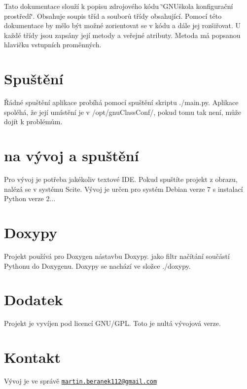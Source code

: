 Tato dokumentace slouží k popisu zdrojového kódu \char`\"{}\-G\-N\-Uškola konfigurační prostředí\char`\"{}. Obsahuje soupis tříd a souborů třídy obsahující. Pomocí této dokumentace by mělo být možné zorientovat se v kódu a dále jej rozšiřovat. U každé třídy jsou zapsány její metody a veřejné atributy. Metoda má popsanou hlavičku vstupních proměnných.\hypertarget{index_Spuštění}{}\section{Spuštění}\label{index_Spuštění}
Řádné spuštění aplikace probíhá pomocí spuštění skriptu ./main.py. Aplikace spoléhá, že její umístění je v /opt/gnu\-Class\-Conf/, pokud tomu tak není, může dojít k problémům.\hypertarget{index_Požadavky}{}\section{na vývoj a spuštění}\label{index_Požadavky}
Pro vývoj je potřeba jakékoliv textové I\-D\-E. Pokud spuštíte projekt z obrazu, nalézá se v systému Scite. Vývoj je určen pro systém Debian verze 7 s instalací Python verze 2...\hypertarget{index_Doxypy}{}\section{Doxypy}\label{index_Doxypy}
Projekt používá pro Doxygen nástavbu Doxypy. jako filtr načítání součástí Pythonu do Doxygenu. Doxypy se nachází ve složce ./doxypy.\hypertarget{index_Dodatek}{}\section{Dodatek}\label{index_Dodatek}
Projekt je vyvíjen pod licencí G\-N\-U/\-G\-P\-L. Toto je nultá vývojová verze.\hypertarget{index_Kontakt}{}\section{Kontakt}\label{index_Kontakt}
Vývoj je ve správě \href{mailto:martin.beranek112@gmail.com}{\tt martin.\-beranek112@gmail.\-com} 